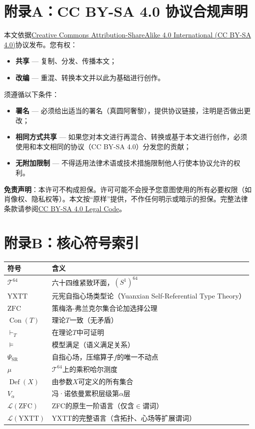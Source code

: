 \documentclass[12pt,a4paper]{article}
\theoremstyle{plain}
\theoremstyle{definition}
\newcommand{\Tsixtyfour}{\mathcal{T}^{64}}
\newcommand{\PSR}{\Psi_{\mathrm{SR}}}
\newcommand{\YXTT}{\mathrm{YXTT}}
\newcommand{\ZFC}{\mathrm{ZFC}}
\newcommand{\Con}{\operatorname{Con}}
\DeclareMathOperator{\Def}{Def}
\begin{document}
\section*{附录A：CC BY-SA 4.0 协议合规声明}
本文依据\href{https://creativecommons.org/licenses/by-sa/4.0/}{Creative Commons Attribution-ShareAlike 4.0 International (CC BY-SA 4.0)}协议发布。您有权：
\begin{itemize}
   \item \textbf{共享} — 复制、分发、传播本文；
   \item \textbf{改编} — 重混、转换本文并以此为基础进行创作。
\end{itemize}
须遵循以下条件：
\begin{itemize}
   \item \textbf{署名} — 必须给出适当的署名（真圆阿奢黎），提供协议链接，注明是否做出更改；
   \item \textbf{相同方式共享} — 如果您对本文进行再混合、转换或基于本文进行创作，必须使用和本文相同的协议（CC BY-SA 4.0）分发您的贡献；
   \item \textbf{无附加限制} — 不得适用法律术语或技术措施限制他人行使本协议允许的权利。
\end{itemize}
\textbf{免责声明}：本许可不构成担保。许可可能不会授予您意图使用的所有必要权限（如肖像权、隐私权等）。本文按“原样”提供，不作任何明示或暗示的担保。完整法律条款请参阅\href{https://creativecommons.org/licenses/by-sa/4.0/legalcode}{CC BY-SA 4.0 Legal Code}。
 
\section*{附录B：核心符号索引}
\begin{longtable}{p{2.5cm}p{10cm}}
\toprule
\textbf{符号} & \textbf{含义} \\
\midrule
$\Tsixtyfour$ & 六十四维紧致环面，$(S^1)^{64}$ \\
$\YXTT$ & 元宪自指心场类型论（Yuanxian Self-Referential Type Theory） \\
$\ZFC$ & 策梅洛-弗兰克尔集合论加选择公理 \\
$\Con(T)$ & 理论$T$一致（无矛盾） \\
$\vdash_T$ & 在理论$T$中可证明 \\
$\vDash$ & 模型满足（语义满足关系） \\
$\PSR$ & 自指心场，压缩算子$f$的唯一不动点 \\
$\mu$ & $\Tsixtyfour$上的乘积哈尔测度 \\
$\Def(X)$ & 由参数$X$可定义的所有集合 \\
$V_\alpha$ & 冯·诺依曼累积层级第$\alpha$层 \\
$\mathcal{L}(\ZFC)$ & ZFC的原生一阶语言（仅含$\in$谓词） \\
$\mathcal{L}(\YXTT)$ & YXTT的完整语言（含拓扑、心场等扩展谓词） \\
\bottomrule
\end{longtable}
 
\end{document}
